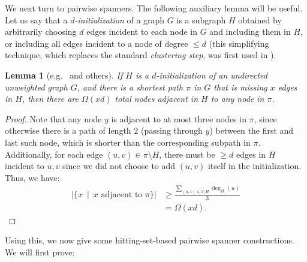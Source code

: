 \documentclass{article}
\newtheorem{lemma}[theorem]{Lemma}
\begin{document}
We next turn to pairwise spanners.
The following auxiliary lemma will be useful.
Let us say that a \emph{$d$-initialization} of a graph $G$ is a subgraph $H$ obtained by arbitrarily choosing $d$ edges incident to each node in $G$ and including them in $H$, or including all edges incident to a node of degree $\le d$ (this simplifying technique, which replaces the standard \emph{clustering step}, was first used in \cite{Knudsen14}).
\begin{lemma} [e.g.\ \cite{Knudsen14, Chechik13soda} and others]\label{lem:initnbhd}
If $H$ is a $d$-initialization of an undirected unweighted graph $G$, and there is a shortest path $\pi$ in $G$ that is missing $x$ edges in $H$, then there are $\Omega(xd)$ total nodes adjacent in $H$ to any node in $\pi$.
\end{lemma}
\begin{proof}
Note that any node $y$ is adjacent to at most three nodes in $\pi$, since otherwise there is a path of length $2$ (passing through $y$) between the first and last such node, which is shorter than the corresponding subpath in $\pi$.
Additionally, for each edge $(u, v) \in \pi \setminus H$, there must be $\ge d$ edges in $H$ incident to $u, v$ since we did not choose to add $(u, v)$ itself in the initialization.
Thus, we have:
\begin{align*}
\left|\{x \ \mid \ x \text{ adjacent to } \pi\}\right| &\ge \frac{\sum \limits_{(u, v) \in \pi \setminus H} \deg_H(u)}{3}\\
&= \Omega\left(xd\right). \tag*{\qedhere}
\end{align*}
\end{proof}

Using this, we now give some hitting-set-based pairwise spanner constructions.
We will first prove:
\end{document}
